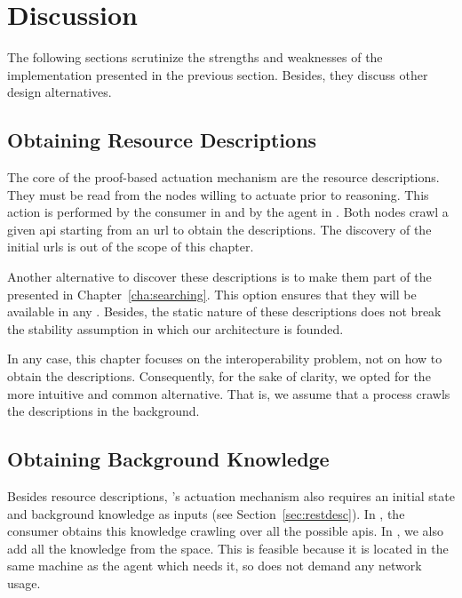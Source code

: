 \section{Discussion}
\label{sec:actuation_discussion}

The following sections scrutinize the strengths and weaknesses of the implementation presented in the previous section.
Besides, they discuss other design alternatives. %

\subsection{Obtaining Resource Descriptions}

The core of the proof-based actuation mechanism are the resource descriptions.
They must be read from the nodes willing to actuate prior to reasoning. %
This action is performed by the consumer in \implRest{} and by the agent in \implMix{}.
Both nodes crawl a given \ac{api} starting from an \ac{url} to obtain the descriptions.
The discovery of the initial \acp{url} is out of the scope of this chapter.


Another alternative to discover these descriptions is to make them part of the \clues{} presented in Chapter~\ref{cha:searching}.
This option ensures that they will be available in any \consumer{}.
Besides, the static nature of these descriptions does not break the \clues{} stability assumption in which our architecture is founded. %


In any case, this chapter focuses on the interoperability problem, not on how to obtain the descriptions.
Consequently, for the sake of clarity, we opted for the more intuitive and common alternative. %
That is, we assume that a process crawls the descriptions in the background.



\subsection{Obtaining Background Knowledge}

Besides resource descriptions, \citeauthor{verborgh_ijcs_2014}'s actuation mechanism also requires an initial state and background knowledge as inputs (see Section~\ref{sec:restdesc}).
In \implRest{}, the consumer obtains this knowledge crawling over all the possible \acsp{api}.
In \implMix{}, we also add all the knowledge from the space.
This is feasible because it is located in the same machine as the agent which needs it, so does not demand any network usage. %


